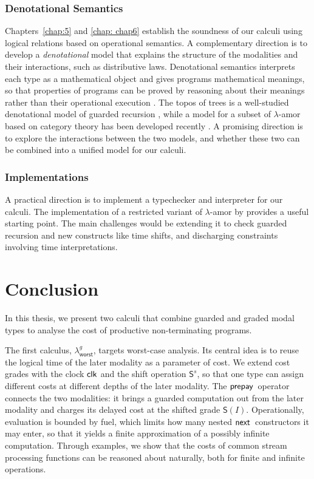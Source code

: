 \subsubsection{Denotational Semantics}
Chapters~\ref{chap:5} and \ref{chap: chap6} establish the soundness of our calculi using logical relations based on operational semantics.
A complementary direction is to develop a \emph{denotational} model that explains the structure of the modalities and their interactions, such as distributive laws.
Denotational semantics interprets each type as a mathematical object and gives programs mathematical meanings, so that properties of programs can be proved by reasoning about their meanings rather than their operational execution \citep{Winskel93}.
The topos of trees is a well-studied denotational model of guarded recursion \citep{birkedal2012}, while a model for a subset of $\lambda$-amor based on 
category theory has been developed recently \citep{binderCategoricalModelsAmortized2026}.
A promising direction is to explore the interactions between the two models, and whether these two can be combined into a unified model for our calculi.

\subsubsection{Implementations}
A practical direction is to implement a typechecker and interpreter for our calculi. 
The implementation of a restricted variant of $\lambda$-amor by 
\cite{cutlerLanguagesPotentialTypes2021} provides a useful starting point. The main challenges would be extending it to check guarded recursion and new constructs like time shifts, and discharging constraints involving 
time interpretations.

\section{Conclusion}
In this thesis, we present two calculi that combine guarded and graded modal types to analyse the cost of productive
non-terminating programs.

The first calculus, $\lambda^g_{\mathsf{worst}}$, targets worst-case analysis. Its central idea is to reuse the logical time
of the later modality as a parameter of cost. We extend cost grades with the clock $\mathsf{clk}$ and the shift operation $\mathsf{S}^s$,
so that one type can assign different costs at different depths of the later modality. The $\mathsf{prepay}\,$ operator connects the two
modalities: it brings a guarded computation out from the later modality and charges its delayed cost at the shifted grade
$\mathsf{S}(I)$. Operationally, evaluation is bounded by fuel, which limits how many nested $\mathsf{next}\,$ constructors it may enter,
so that it yields a finite approximation of a possibly infinite computation.
Through examples, we show that the costs of common stream processing functions can be reasoned about naturally, both for
finite and infinite operations.

